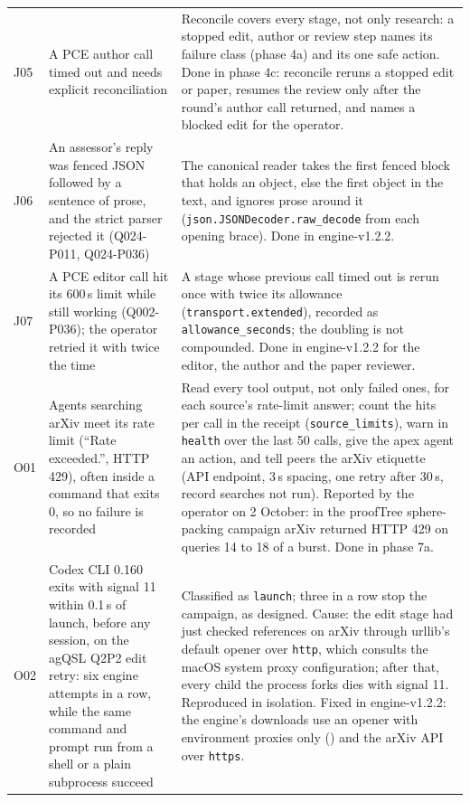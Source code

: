 \documentclass[11pt,a4paper]{article}
\begin{document}
{\begin{xltabular}{\linewidth}{L{8mm}L{56mm}Y}
J05 & A PCE author call timed out and needs explicit reconciliation & Reconcile covers every stage, not only research: a stopped edit, author or review step names its failure class (phase 4a) and its one safe action. Done in phase 4c: reconcile reruns a stopped edit or paper, resumes the review only after the round's author call returned, and names a blocked edit for the operator.\\
J06 & An assessor's reply was fenced JSON followed by a sentence of prose, and the strict parser rejected it (Q024-P011, Q024-P036) & The canonical reader takes the first fenced block that holds an object, else the first object in the text, and ignores prose around it (\texttt{json.JSONDecoder.raw\_decode} from each opening brace). Done in engine-v1.2.2.\\
J07 & A PCE editor call hit its 600\,s limit while still working (Q002-P036); the operator retried it with twice the time & A stage whose previous call timed out is rerun once with twice its allowance (\texttt{transport.extended}), recorded as \texttt{allowance\_seconds}; the doubling is not compounded. Done in engine-v1.2.2 for the editor, the author and the paper reviewer.\\
O01 & Agents searching arXiv meet its rate limit (``Rate exceeded.'', HTTP 429), often inside a command that exits 0, so no failure is recorded & Read every tool output, not only failed ones, for each source's rate-limit answer; count the hits per call in the receipt (\texttt{source\_limits}), warn in \texttt{health} over the last 50 calls, give the apex agent an action, and tell peers the arXiv etiquette (API endpoint, 3\,s spacing, one retry after 30\,s, record searches not run). Reported by the operator on 2 October: in the proofTree sphere-packing campaign arXiv returned HTTP 429 on queries 14 to 18 of a burst. Done in phase 7a.\\
O02 & Codex CLI 0.160 exits with signal 11 within 0.1\,s of launch, before any session, on the agQSL Q2P2 edit retry: six engine attempts in a row, while the same command and prompt run from a shell or a plain subprocess succeed & Classified as \texttt{launch}; three in a row stop the campaign, as designed. Cause: the edit stage had just checked references on arXiv through urllib's default opener over \texttt{http}, which consults the macOS system proxy configuration; after that, every child the process forks dies with signal 11. Reproduced in isolation. Fixed in engine-v1.2.2: the engine's downloads use an opener with environment proxies only () and the arXiv API over \texttt{https}.\\

\end{xltabular}}
\end{document}
